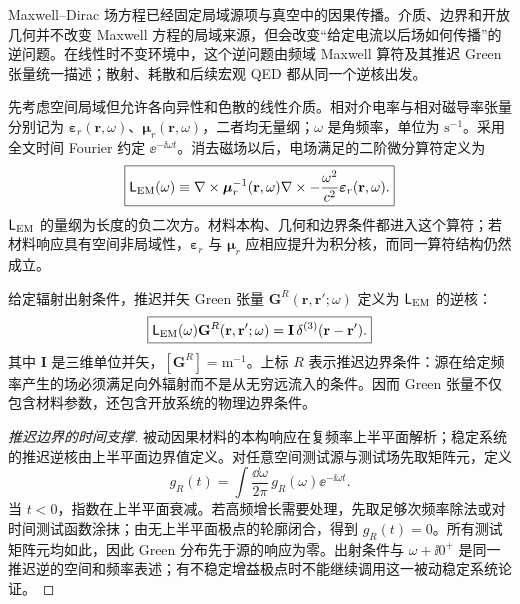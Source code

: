 Maxwell--Dirac 场方程已经固定局域源项与真空中的因果传播。介质、边界和开放几何并不改变 Maxwell 方程的局域来源，但会改变“给定电流以后场如何传播”的逆问题。在线性时不变环境中，这个逆问题由频域 Maxwell 算符及其推迟 Green 张量统一描述；散射、耗散和后续宏观 QED 都从同一个逆核出发。

先考虑空间局域但允许各向异性和色散的线性介质。相对介电率与相对磁导率张量分别记为 $\boldsymbol\varepsilon_r(\mathbf r,\omega)$、$\boldsymbol\mu_r(\mathbf r,\omega)$，二者均无量纲；$\omega$ 是角频率，单位为 $\mathrm{s^{-1}}$。采用全文时间 Fourier 约定 $\ee^{-\ii\omega t}$。消去磁场以后，电场满足的二阶微分算符定义为
\begin{equation}
 \boxed{
 \mathsf L_{\rm EM}(\omega)
 \equiv
 \nabla\times\boldsymbol\mu_r^{-1}(\mathbf r,\omega)\nabla\times
 -\frac{\omega^2}{c^2}\boldsymbol\varepsilon_r(\mathbf r,\omega).}
 \label{eq:Maxwell-operator-SI-r12}\end{equation}
$\mathsf L_{\rm EM}$ 的量纲为长度的负二次方。材料本构、几何和边界条件都进入这个算符；若材料响应具有空间非局域性，$\boldsymbol\varepsilon_r$ 与 $\boldsymbol\mu_r$ 应相应提升为积分核，而同一算符结构仍然成立。

\begin{definition}
给定辐射出射条件，推迟并矢 Green 张量 $\mathbf G^R(\mathbf r,\mathbf r';\omega)$ 定义为 $\mathsf L_{\rm EM}$ 的逆核：
\begin{equation}
 \boxed{
 \mathsf L_{\rm EM}(\omega)
 \mathbf G^R(\mathbf r,\mathbf r';\omega)
 =\mathbf I\,\delta^{(3)}(\mathbf r-\mathbf r').}
 \label{eq:GR-Maxwell-SI-r12}\end{equation}
其中 $\mathbf I$ 是三维单位并矢，$[\mathbf G^R]=\mathrm{m^{-1}}$。上标 $R$ 表示推迟边界条件：源在给定频率产生的场必须满足向外辐射而不是从无穷远流入的条件。因而 Green 张量不仅包含材料参数，还包含开放系统的物理边界条件。

\end{definition}

\begin{proof}[推迟边界的时间支撑]
被动因果材料的本构响应在复频率上半平面解析；稳定系统的推迟逆核由上半平面边界值定义。对任意空间测试源与测试场先取矩阵元，定义
\begin{equation*}
 g_R(t)=\int\frac{\dd\omega}{2\pi}\,g_R(\omega)\ee^{-\ii\omega t}.
\end{equation*}
当 $t<0$，指数在上半平面衰减。若高频增长需要处理，先取足够次频率除法或对时间测试函数涂抹；由无上半平面极点的轮廓闭合，得到 $g_R(t)=0$。所有测试矩阵元均如此，因此 Green 分布先于源的响应为零。出射条件与 $\omega+\ii0^+$ 是同一推迟逆的空间和频率表述；有不稳定增益极点时不能继续调用这一被动稳定系统论证。
\end{proof}

